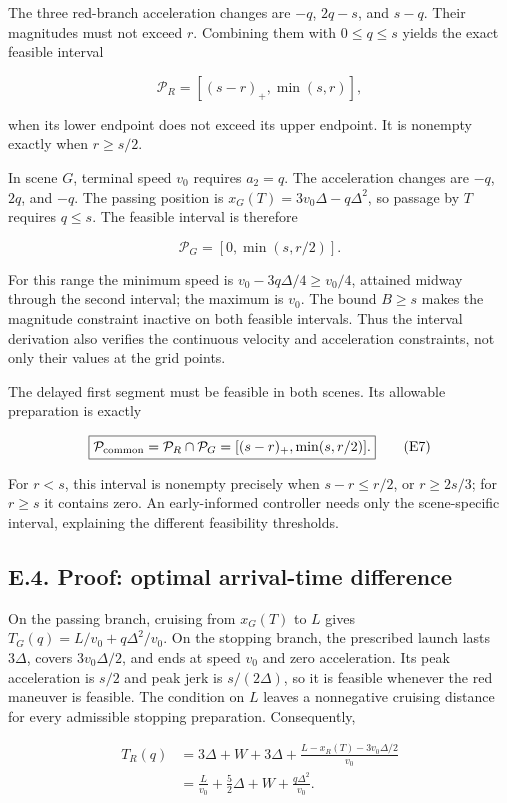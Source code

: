 \documentclass[letterpaper,journal,onecolumn]{IEEEtran}
\begin{document}
The three red-branch acceleration changes are \(-q\), \(2q-s\), and \(s-q\). Their magnitudes must not exceed \(r\). Combining them with \(0\le q\le s\) yields the exact feasible interval

\[
\mathcal P_R=[(s-r)_+,\min(s,r)],
\tag{E5}
\]

when its lower endpoint does not exceed its upper endpoint. It is nonempty exactly when \(r\ge s/2\).

In scene \(G\), terminal speed \(v_0\) requires \(a_2=q\). The acceleration changes are \(-q\), \(2q\), and \(-q\). The passing position is \(x_G(T)=3v_0\Delta-q\Delta^2\), so passage by \(T\) requires \(q\le s\). The feasible interval is therefore

\[
\mathcal P_G=[0,\min(s,r/2)].
\tag{E6}
\]

For this range the minimum speed is \(v_0-3q\Delta/4\ge v_0/4\), attained midway through the second interval; the maximum is \(v_0\). The bound \(B\ge s\) makes the magnitude constraint inactive on both feasible intervals. Thus the interval derivation also verifies the continuous velocity and acceleration constraints, not only their values at the grid points.

The delayed first segment must be feasible in both scenes. Its allowable preparation is exactly

\[
\boxed{\mathcal P_{\rm common}
=\mathcal P_R\cap\mathcal P_G
=[(s-r)_+,\min(s,r/2)].}
\tag{E7}
\]

For \(r<s\), this interval is nonempty precisely when \(s-r\le r/2\), or \(r\ge2s/3\); for \(r\ge s\) it contains zero. An early-informed controller needs only the scene-specific interval, explaining the different feasibility thresholds.

\subsection*{E.4. Proof: optimal arrival-time difference}

On the passing branch, cruising from \(x_G(T)\) to \(L\) gives \(T_G(q)=L/v_0+q\Delta^2/v_0\). On the stopping branch, the prescribed launch lasts \(3\Delta\), covers \(3v_0\Delta/2\), and ends at speed \(v_0\) and zero acceleration. Its peak acceleration is \(s/2\) and peak jerk is \(s/(2\Delta)\), so it is feasible whenever the red maneuver is feasible. The condition on \(L\) leaves a nonnegative cruising distance for every admissible stopping preparation. Consequently,

\[
\begin{aligned}
T_R(q)
&=3\Delta+W+3\Delta
+\frac{L-x_R(T)-3v_0\Delta/2}{v_0}\\
&=\frac{L}{v_0}+\frac52\Delta+W
+\frac{q\Delta^2}{v_0}.
\end{aligned}
\tag{E8}
\]
\end{document}
